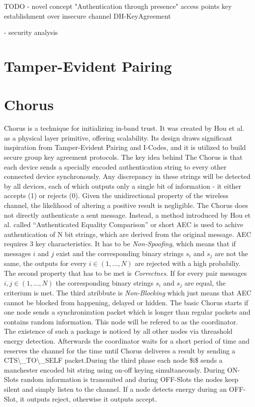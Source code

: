 \documentclass[conference]{IEEEtran}
\begin{document}
TODO
- novel concept "Authentication through presence"
    access points
    key establishment over insecure channel
        DH-KeyAgreement

- security analysis


\section{Tamper-Evident Pairing}

\section{Chorus}

Chorus is a technique for initializing in-band trust. It was created by Hou et al. as a physical layer primitive, offering scalability.
Its design draws significant inspiration from Tamper-Evident Pairing and I-Codes, and it is utilized to build secure group key agreement protocols.
The key idea behind The Chorus is that each device sends a specially encoded authentication string to every other connected device synchronously. 
Any discrepancy in these strings will be detected by all devices, each of which outputs only a single bit of information - it either accepts (1) or rejects (0).
Given the unidirectional property of the wireless channel, the likelihood of altering a positive result is negligible. The Chorus does not directly authenticate a sent message. Instead, a method introduced by Hou et al. called ``Authenticated Equality Comparison'' or short AEC is used to achive authentication of N bit strings, which are derived from the original message. 
AEC requires 3 key characteristics. It has to be \textit{Non-Spoofing}, which means that if messages $i$ and $j$ exist and the corresponding binary strings $s_i$ and $s_j$ are not the same, the outputs for every $i \in (1, . . . , N)$ are rejected with a high probabiliy. The second property that has to be met is \textit{Correctnes}. If for every pair messages $i,j \in (1, . . . , N)$ the corresponding binary strings $s_i$ and $s_j$ are equal, the criterium is met. The third atribbute is \textit{Non-Blocking} which just means that AEC cannot be blocked from happening, delayed or hidden.
The basic Chorus starts if one node sends a synchronization packet which is longer than regular packets and contains random information. This node will be refered to as the coordinator. The existence of such a package is noticed by all other nodes via threashold energy detection. Afterwards the coordinator waits for a short period of time and reserves the channel for the time until Chorus deliveres a result by sending a CTS\textbackslash \_TO\textbackslash \_SELF packet.During the third phase each node \$i\$ sends a manchester encoded bit string using on-off keying simultaneously. During ON-Slots random information is transmited and during OFF-Slots the nodes keep silent and simply listen to the channel. If a node detects energy during an OFF-Slot, it outputs reject, otherwise it outputs accept.
\end{document}
